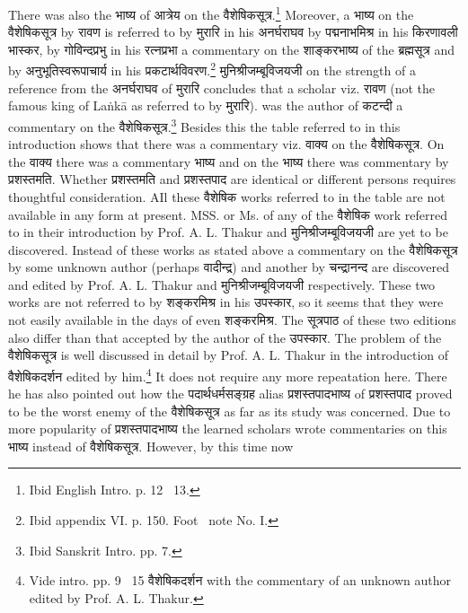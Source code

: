 \documentclass[11pt, openany]{book}
\begin{document}
\newpage
There was also the भाष्य of आत्रेय on the वैशेषिकसूत्र.\renewcommand{\thefootnote}{1}\footnote{Ibid English Intro. p. 12 \textendash\ 13.} Moreover, a भाष्य on the वैशेषिकसूत्र by रावण is referred to by मुरारि in his अनर्घराघव by पद्मनाभमिश्र in his किरणावली भास्कर, by गोविन्दप्रभु in his रत्नप्रभा a commentary on the शाङ्करभाष्य of the ब्रह्मसूत्र and by अनुभूतिस्वरूपाचार्य in his प्रकटार्थविवरण.\renewcommand{\thefootnote}{2}\footnote{Ibid appendix VI. p. 150. Foot \textendash\ note No. I.} मुनिश्रीजम्बूविजयजी on the strength of a reference from the अनर्घराघव of मुरारि concludes that a scholar viz. रावण (not the famous king of Laṅkā as referred to by मुरारि). was the author of कटन्दी a commentary on the वैशेषिकसूत्र.\renewcommand{\thefootnote}{3}\footnote{Ibid Sanskrit Intro. pp. 7.} Besides this the table referred to in this introduction shows that there was a commentary viz. वाक्य on the वैशेषिकसूत्र. On the वाक्य there was a commentary भाष्य and on the भाष्य there was commentary by प्रशस्तमति. Whether प्रशस्तमति and प्रशस्तपाद are identical or different persons requires thoughtful consideration. AIl these वैशेषिक works referred to in the table are not available in any form at present. MSS. or Ms. of any of the वैशेषिक work referred to in their introduction by Prof. A. L. Thakur and मुनिश्रीजम्बूविजयजी are yet to be discovered. Instead of these works as stated above a commentary on the वैशेषिकसूत्र by some unknown author (perhaps वादीन्द्र) and another by चन्द्रानन्द are discovered and edited by Prof. A. L. Thakur and मुनिश्रीजम्बूविजयजी respectively. These two works are not referred to by शङ्करमिश्र in his उपस्कार, so it seems that they were not easily available in the days of even शङ्करमिश्र. The सूत्रपाठ of these two editions also differ than that accepted by the author of the उपस्कार. The problem of the वैशेषिकसूत्र is well discussed in detail by Prof. A. L. Thakur in the introduction of वैशेषिकदर्शन edited by him.\renewcommand{\thefootnote}{4}\footnote{Vide intro. pp. 9 \textendash\ 15 वैशेषिकदर्शन with the commentary of an unknown author edited by Prof. A. L. Thakur.} It does not require any more repeatation here. There he has also pointed out how the पदार्थधर्मसङ्ग्रह alias प्रशस्तपादभाष्य of प्रशस्तपाद proved to be the worst enemy of the वैशेषिकसूत्र as far as its study was concerned. Due to more popularity of प्रशस्तपादभाष्य the learned scholars wrote commentaries on this भाष्य instead of वैशेषिकसूत्र. However, by this time now
\end{document}
